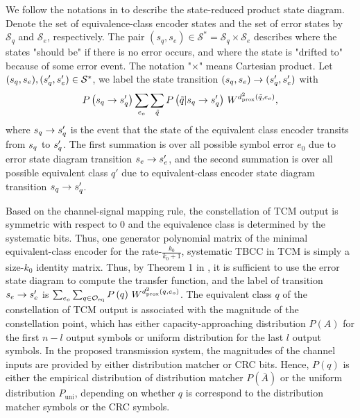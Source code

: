 \documentclass [PhD] {uclathes}
\begin{document}
We follow the notations in \cite{wesel2004statereduction} to describe the state-reduced product state diagram. Denote the set of equivalence-class encoder states and the set of error states by $\mathcal{S}_{q}$ and $\mathcal{S}_e$, respectively. 
The pair $(s_q,s_e)\in\mathcal{S}^*=\mathcal{S}_q\times\mathcal{S}_e$ describes where the states "should be" if there is no error occurs, and where the state is "drifted to" because of some error event. The notation "$\times$" means Cartesian product. Let $(s_{q},s_e),(s'_{q},s'_e)\in\mathcal{S}^*$, we label the state transition $(s_{q}, s_e) \to (s'_{q}, s'_e)$ with 
\begin{equation}
    \label{equ:branchlabel}
    P\left(s_{q} \to s'_{q}\right)
    \sum_{ e_o } \sum_{\tilde{{q}}} P\left(\tilde{{q}} | s_{q} \to s'_{q}\right)\, W^{d_{\mathrm{prox}}^2(\tilde{{q}}, e_o)},
\end{equation}
where $s_{q}\rightarrow s'_{q}$ is the event that the state of the equivalent class encoder transits from $s_{q}$ to $s'_{q}$. 
The first summation is over   all possible symbol error $e_0$ due to error state diagram transition $s_e \to s'_e$, and the second summation is over   all possible equivalent class $q'$ due to equivalent-class encoder state diagram transition $s_{q} \to s'_{q}$.

Based on the channel-signal mapping rule, the  constellation of TCM output is symmetric with respect to 0 and the equivalence class is determined by the systematic bits.  Thus, one generator polynomial matrix of the minimal equivalent-class encoder for the rate-$\frac{k_0}{k_0+1}$, systematic TBCC in TCM is simply a size-$k_0$ identity matrix. Thus, by Theorem 1 in \cite{wesel2004statereduction},  it is sufficient to use the error state diagram to compute the transfer function, and the label of transition $s_e \rightarrow s'_e$ is $\sum_{ e_o } \sum_{{q}\in\mathcal{O}_\text{eq}}P\left({q}\right)\, W^{d_{\mathrm{prox}}^2({q}, e_o)}$. The equivalent class $q$ of  the constellation of TCM output is associated with the magnitude of the constellation point, which has either capacity-approaching distribution $P({A})$ for the first $n-l$ output symbols or uniform distribution for the last $l$  output symbols.
In the proposed transmission system, the magnitudes of the channel inputs are provided by either distribution matcher or CRC bits. Hence, $P(q)$ is either the empirical distribution of distribution matcher $P(\bar{A})$ or the uniform distribution $P_{\mathrm{uni}}$, depending on whether $q$ is correspond to the  distribution matcher symbols or the CRC symbols.
\end{document}
